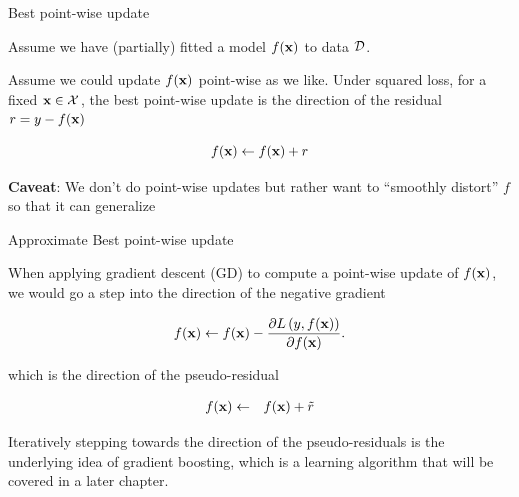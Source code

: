 \documentclass[11pt,compress,t,notes=noshow, xcolor=table]{beamer}
\begin{document}
\begin{frame}[t]{Best point-wise update}

    Assume we have (partially) fitted a model $f(\mathbf{x})$ to data $\mathcal{D}$. 

\lz 

Assume we could update $f(\mathbf{x})$ point-wise as we like. Under squared loss, for a fixed $\mathbf{x} \in \mathcal{X}$, the best point-wise update is the direction of the residual $r = y - f(\mathbf{x})$

$$
	f(\mathbf{x}) \leftarrow f(\mathbf{x}) + r
$$


\begin{overlayarea}{\textwidth}{\textheight}
\begin{center}
\end{center}
\vspace{-0.5cm}
\footnotesize{\textbf{Caveat}: We don't do point-wise updates but rather want to ``smoothly distort'' $f$ so that it can generalize}
\end{overlayarea} 

\end{frame}

\begin{vbframe}{Approximate Best point-wise update}

When applying gradient descent (GD) to compute a point-wise update of $f(\mathbf{x})$, we would go a step into the direction of the negative gradient

$$
	f(\mathbf{x}) \leftarrow f(\mathbf{x}) - \frac{\partial L\left(y, f(\mathbf{x})\right)}{\partial f(\mathbf{x})}. 
$$

which is the direction of the pseudo-residual

\begin{eqnarray*}
	f(\mathbf{x}) &\leftarrow& f(\mathbf{x}) + \tilde r\\ 
\end{eqnarray*}

Iteratively stepping towards the direction of the pseudo-residuals is the underlying idea of gradient boosting, which is a learning algorithm that will be covered in a later chapter. 


\end{vbframe}
\end{document}
